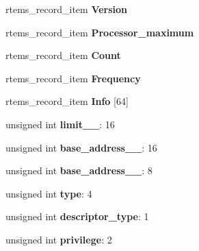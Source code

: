 \begin{DoxyCompactItemize}
rtems\+\_\+record\+\_\+item {\bfseries Version}
\item 
\mbox{\label{structRTEMS__PACKED_aef6957a023304a14da4c01b93c8a0cb9}} 
rtems\+\_\+record\+\_\+item {\bfseries Processor\+\_\+maximum}
\item 
\mbox{\label{structRTEMS__PACKED_af0bf2bad92b51b99d2cd49c689bea9e2}} 
rtems\+\_\+record\+\_\+item {\bfseries Count}
\item 
\mbox{\label{structRTEMS__PACKED_a543c8cfbc55f5b6cfa02667bd206bde0}} 
rtems\+\_\+record\+\_\+item {\bfseries Frequency}
\item 
\mbox{\label{structRTEMS__PACKED_ad23c105772785ff21092636e6d678f03}} 
rtems\+\_\+record\+\_\+item {\bfseries Info} \mbox{[}64\mbox{]}
\item 
\mbox{\label{structRTEMS__PACKED_ad6dff3e3120523ce1c3d4c55ea4bc6f5}} 
unsigned int {\bfseries limit\+\_\+\_}\+: 16
\item 
\mbox{\label{structRTEMS__PACKED_a9d6fa7eb485407d74eec333b3891b5b4}} 
unsigned int {\bfseries base\+\_\+address\+\_\+\_}\+: 16
\item 
\mbox{\label{structRTEMS__PACKED_a1bba3a1af68466d8acaa7b21c3d1226c}} 
unsigned int {\bfseries base\+\_\+address\+\_\+\_}\+: 8
\item 
\mbox{\label{structRTEMS__PACKED_a9b8dd6076fd14753cdeb4d682038b34f}} 
unsigned int {\bfseries type}\+: 4
\item 
\mbox{\label{structRTEMS__PACKED_af463c71ea1d3b2e8658c6138aec3190e}} 
unsigned int {\bfseries descriptor\+\_\+type}\+: 1
\item 
\mbox{\label{structRTEMS__PACKED_a453035c29c07372791edc353603e08bc}} 
unsigned int {\bfseries privilege}\+: 2
\item 
\mbox{\label{structRTEMS__PACKED_ae38fdb9a76fc03929cccedc9eb54489e}} 

\end{DoxyCompactItemize}
